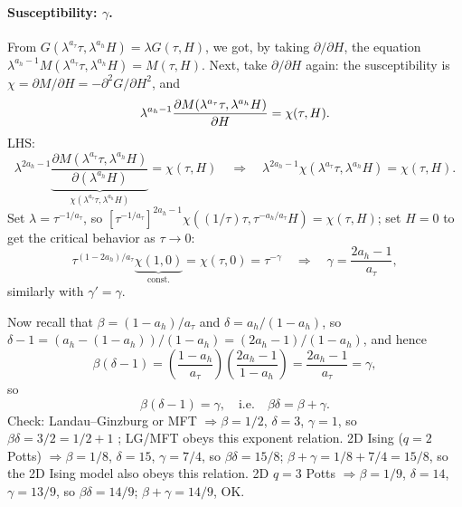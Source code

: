 \paragraph{Susceptibility: $\gamma$.} From $G(\lambda^{a_\tau}\tau,\lambda^{a_h}H) = \lambda G(\tau,H)$, we
got, by taking $\partial/\partial H$, the equation
$\lambda^{a_h-1}M(\lambda^{a_\tau}\tau,\lambda^{a_h}H) = M(\tau,H)$. Next, take $\partial/\partial H$ again:
the susceptibility is $\chi = \partial M/\partial H = -\partial^2G/\partial H^2$, and
\begin{equation}
  \lambda^{a_h-1}\frac{\partial M(\lambda^{a_\tau}\tau,\lambda^{a_h}H)}{\partial H} = \chi(\tau,H).
\end{equation}
LHS:
\begin{equation}
  \lambda^{2a_h-1}\underbrace{\frac{\partial M(\lambda^{a_\tau}\tau,\lambda^{a_h}H)}{\partial(\lambda^{a_h}H)}}_{\chi(\lambda^{a_\tau}\tau,\lambda^{a_h}H)} = \chi(\tau,H)
  \quad\Rightarrow\quad \lambda^{2a_h-1}\chi(\lambda^{a_\tau}\tau,\lambda^{a_h}H) = \chi(\tau,H).
\end{equation}
Set $\lambda = \tau^{-1/a_\tau}$, so
$\left[\tau^{-1/a_\tau}\right]^{2a_h-1}\chi\left(\left(1/\tau\right)\tau,\tau^{-a_h/a_\tau}H\right) = \chi(\tau,H)$;
set $H = 0$ to get the critical behavior as $\tau\to 0$:
\begin{equation}
  \tau^{(1-2a_h)/a_\tau}\underbrace{\chi(1,0)}_{\text{const.}} = \chi(\tau,0) = \tau^{-\gamma}
  \quad\Rightarrow\quad\boxed{\gamma = \frac{2a_h-1}{a_\tau}},
\end{equation}
similarly with $\boxed{\gamma' = \gamma}$.

Now recall that $\beta = (1-a_h)/a_\tau$ and $\delta = a_h/(1-a_h)$, so
$\delta - 1 = (a_h-(1-a_h))/(1-a_h) = (2a_h-1)/(1-a_h)$, and hence
\begin{equation}
  \beta(\delta-1) = \left(\frac{1-a_h}{a_\tau}\right)\left(\frac{2a_h-1}{1-a_h}\right) = \frac{2a_h-1}{a_\tau} = \gamma,
\end{equation}
so
\begin{equation}
  \boxed{\beta(\delta-1) = \gamma},\quad\text{i.e.}\quad\boxed{\beta\delta = \beta+\gamma}.
\end{equation}
Check: Landau--Ginzburg or MFT $\Rightarrow\beta = 1/2$, $\delta = 3$, $\gamma = 1$, so
$\beta\delta = 3/2 = 1/2+1$ \checkmark; LG/MFT obeys this exponent relation.
2D Ising ($q = 2$ Potts) $\Rightarrow\beta = 1/8$, $\delta = 15$, $\gamma = 7/4$, so
$\beta\delta = 15/8$; $\beta+\gamma = 1/8+7/4 = 15/8$, so the 2D Ising model also
obeys this relation. 2D $q = 3$ Potts $\Rightarrow\beta = 1/9$, $\delta = 14$, $\gamma = 13/9$,
so $\beta\delta = 14/9$; $\beta+\gamma = 14/9$, OK.

